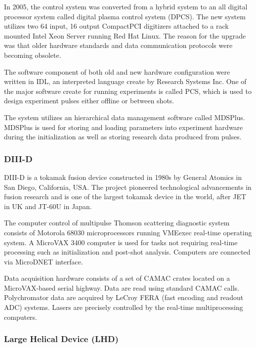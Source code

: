 In 2005, the control system was converted from a hybrid system to an all digital processor system called digital plasma control system (DPCS)\cite{Stillerman20061905}. The new system utilizes two 64 input, 16 output CompactPCI digitizers attached to a rack mounted Intel Xeon Server running Red Hat Linux. The reason for the upgrade was that older hardware standards and data communication protocols were becoming obsolete.

The software component of both old and new hardware configuration were written in IDL, an interpreted language create by Research Systems Inc. One of the major software create for running experiments is called PCS, which is used to design experiment pulses either offline or between shots.

The system utilizes an hierarchical data management software called MDSPlus\cite{stillerman1997mdsplus}. MDSPlus is used for storing and loading parameters into experiment hardware during the initialization as well as storing research data produced from pulses.

\subsubsection{DIII-D}

DIII-D is a tokamak fusion device constructed in 1980s by General Atomics in San Diego, California, USA. The project pioneered technological advancements in fusion research and is one of the largest tokamak device in the world, after JET in UK and JT-60U in Japan.

The computer control of multipulse Thomson scattering diagnostic system\cite{greenfield1990real} consists of Motorola 68030 microprocessors running VMEexec real-time operating system. A MicroVAX 3400 computer is used for tasks not requiring real-time processing such as initialization and post-shot analysis. Computers are connected via MicroDNET interface. 

Data acquisition hardware consists of a set of CAMAC crates located on a MicroVAX-based serial highway. Data are read using standard CAMAC calls. Polychromator data are acquired by LeCroy FERA (fast encoding and readout ADC) systems. Lasers are precisely controlled by the real-time multiprocessing computers.

\subsubsection{Large Helical Device (LHD)}

